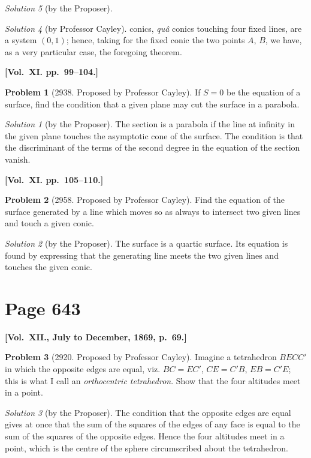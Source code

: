 \documentclass[12pt,a4paper]{article}
\theoremstyle{plain}
\theoremstyle{definition}
\newtheorem{problem}{Problem}
\theoremstyle{remark}
\newtheorem*{solution}{Solution}
\begin{document}
\begin{solution}[by the Proposer]
\begin{solution}[by Professor Cayley]
conics, \textit{qu\^{a}} conics touching four fixed lines, are a system $(0, 1)$; hence, taking for the fixed conic the two points $A$, $B$, we have, as a very particular case, the foregoing theorem.

\medskip\noindent\textbf{[Vol.~XI. pp.~99--104.]}

\begin{problem}[2938. Proposed by Professor Cayley]
If $S = 0$ be the equation of a surface, find the condition that a given plane may cut the surface in a parabola.
\end{problem}

\begin{solution}[by the Proposer]
The section is a parabola if the line at infinity in the given plane touches the asymptotic cone of the surface. The condition is that the discriminant of the terms of the second degree in the equation of the section vanish.
\end{solution}

\medskip\noindent\textbf{[Vol.~XI. pp.~105--110.]}

\begin{problem}[2958. Proposed by Professor Cayley]
Find the equation of the surface generated by a line which moves so as always to intersect two given lines and touch a given conic.
\end{problem}

\begin{solution}[by the Proposer]
The surface is a quartic surface. Its equation is found by expressing that the generating line meets the two given lines and touches the given conic.
\end{solution}

\section*{Page 643}
\setcounter{page}{643}

\medskip\noindent\textbf{[Vol.~XII., July to December, 1869, p.~69.]}

\begin{problem}[2920. Proposed by Professor Cayley]
Imagine a tetrahedron $BECC'$ in which the opposite edges are equal, viz. $BC = EC'$, $CE = C'B$, $EB = C'E$; this is what I call an \textit{orthocentric tetrahedron}. Show that the four altitudes meet in a point.
\end{problem}

\begin{solution}[by the Proposer]
The condition that the opposite edges are equal gives at once that the sum of the squares of the edges of any face is equal to the sum of the squares of the opposite edges. Hence the four altitudes meet in a point, which is the centre of the sphere circumscribed about the tetrahedron.
\end{solution}


\end{solution}
\end{solution}
\end{document}
